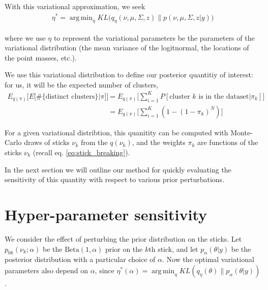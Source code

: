 \documentclass[a4paper]{article}
\DeclareMathOperator*{\argmin}{arg\,min}
\begin{document}
With this variational approximation, we seek
\begin{align}
\eta^* = \argmin_{\eta} KL\Big(q_\eta(\nu, \mu, \Sigma, z) \big\| p(\nu, \mu, \Sigma, z | y)\Big) \label{eq:kl_objective}
\end{align}

where we use $\eta$ to represent the variational parameters be the parameters of the variational distribution
(the mean variance of the logitnormal, the locations of the point masses, etc.).

We use this variational distribution to define our posterior quantitiy of
interest: for us, it will be the expected number of
clusters,
\begin{align}
  E_{q(\pi)}\Big[E\Big[\#\{\text{distinct clusters}\}|\pi\Big]\Big] &=
  E_{q(\pi)}\Big[\sum_{i=1}^K P[\text{cluster $k$ is in the dataset}|\pi_k]\Big] \\
    &= E_{q(\pi)} \Big[\sum_{i=1}^K (1 - (1 - \pi_k)^N)\Big]
    \label{eq:expected_num_clusters}
\end{align}

For a given variational distribtion, this quanitity can be computed with
Monte-Carlo draws of sticks $\nu_k$ from the $q(\nu_k)$, and the weights $\pi_k$
are functions of the sticks $\nu_k$ (recall eq. \ref{eq:stick_breaking}).

In the next section we will outline our method for quickly evaluating the
sensitivity of this quantity with respect to various prior perturbations.

%

\section{Hyper-parameter sensitivity}

We consider the effect of perturbing the prior distribution on the sticks.
Let $p_{0k}(\nu_k; \alpha)$ be the $\text{Beta}(1, \alpha)$ prior on the $k$th stick, and
let $p_{\alpha}(\theta | y)$ be the posterior distribution with a particular choice of $\alpha$.
Now the optimal variational parameters also depend on $\alpha$, since $\eta^*(\alpha) =
\argmin_\eta KL(q_\eta\left(\theta\right) \| p_{\alpha}(\theta | y))$.
\end{document}
